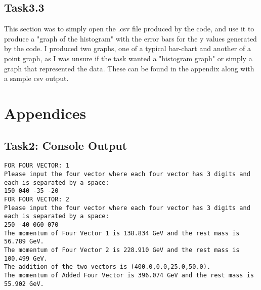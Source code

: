 \documentclass{article}
\begin{document}
\begin{multicols}{2}
	\subsection{Task3.3}
	This section was to simply open the .csv file produced by the code, and use it to produce a "graph of the histogram" with the error bars for the y values generated by the code. I produced two graphs, one of a typical bar-chart and another of a point graph, as I was unsure if the task wanted a "histogram graph" or simply a graph that represented the data. These can be found in the appendix along with a sample csv output.
\end{multicols}
\newpage

\section{Appendices}
\subsection{Task2: Console Output}
	\begin{lstlisting}
FOR FOUR VECTOR: 1
Please input the four vector where each four vector has 3 digits and each is separated by a space:	
150 040 -35 -20
FOR FOUR VECTOR: 2
Please input the four vector where each four vector has 3 digits and each is separated by a space:	
250 -40 060 070
The momentum of Four Vector 1 is 138.834 GeV and the rest mass is 56.789 GeV.
The momentum of Four Vector 2 is 228.910 GeV and the rest mass is 100.499 GeV.
The addition of the two vectors is (400.0,0.0,25.0,50.0).
The momentum of Added Four Vector is 396.074 GeV and the rest mass is 55.902 GeV.
	\end{lstlisting}
\end{document}
